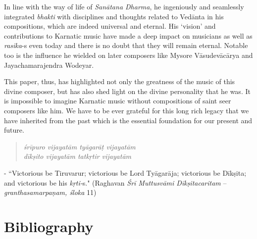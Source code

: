 In line with the way of life of \textit{Sanātana Dharma}, he ingeniously and seamlessly integrated \textit{bhakti} with disciplines and thoughts related to Vedānta in his compositions, which are indeed universal and eternal. His ‘vision’ and contributions to Karnatic music have made a deep impact on musicians as well as \textit{rasika}-s even today and there is no doubt that they will remain eternal. Notable too is the influence he wielded on later composers like Mysore Vāsudevācārya and Jayachamarajendra Wodeyar.

This paper, thus, has highlighted not only the greatness of the music of this divine composer, but has also shed light on the divine personality that he was. It is impossible to imagine Karnatic music without compositions of saint seer composers like him. We have to be ever grateful for this long rich legacy that we have inherited from the past which is the essential foundation for our present and future.

\vspace{-.3cm}

\begin{verse}
\textit{śrīpuro vijayatām tyāgarāṭ vijayatām} \\ \textit{dīkṣito vijayatām tatkṛtir vijayatām} 
\end{verse}

\vspace{-.3cm}

- ``Victorious be Tiruvarur; victorious be Lord Tyāgarāja; victorious be Dīkṣita; and victorious be his \textit{kṛti-}s." (Raghavan \textit{Śrī Muttusvāmi Dīkṣitacaritam} – \textit{granthasamarpaṇam, śloka} 11)

\newpage

\section*{Bibliography}

